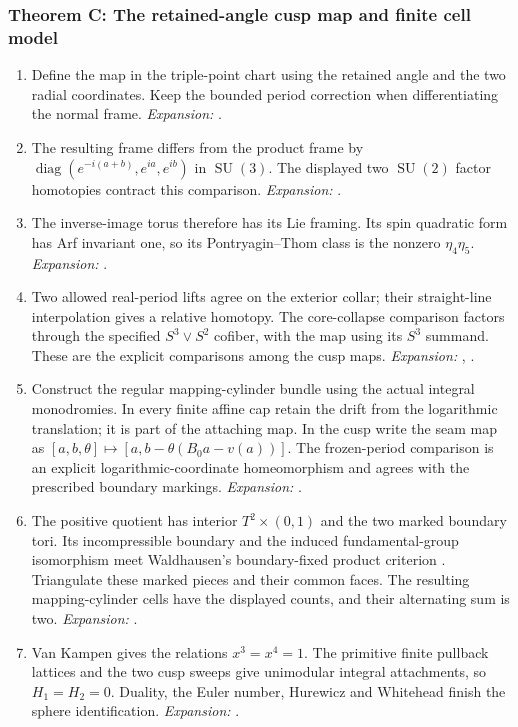 \hypertarget{outline-III-C}{}
\subsubsection*{Theorem C: The retained-angle cusp map and finite cell model}
\begin{enumerate}[label=\arabic*.,leftmargin=*]
\item\hypertarget{step-III-C-1}{} Define the map in the triple-point chart using the retained
angle and the two radial coordinates.  Keep the bounded period
correction when differentiating the normal frame.
\textit{Expansion:} .
\item\hypertarget{step-III-C-2}{} The resulting frame differs from the product frame by
$\operatorname{diag}(e^{-i(a+b)},e^{ia},e^{ib})$ in
$\operatorname{SU}(3)$.  The displayed two $\operatorname{SU}(2)$
factor homotopies contract this comparison.
\textit{Expansion:} .
\item\hypertarget{step-III-C-3}{} The inverse-image torus therefore has its Lie framing.  Its
spin quadratic form has Arf invariant one, so its Pontryagin--Thom
class is the nonzero $\eta_4\eta_5$.
\textit{Expansion:} .
\item\hypertarget{step-III-C-4}{} Two allowed real-period lifts agree on the exterior collar;
their straight-line interpolation gives a relative homotopy.
The core-collapse comparison factors through the specified
$S^3\vee S^2$ cofiber, with the map using its $S^3$ summand.
These are the explicit comparisons among the cusp maps.
\textit{Expansion:} , .
\item\hypertarget{step-III-C-5}{} Construct the regular mapping-cylinder bundle using the actual
integral monodromies.  In every finite affine cap retain the drift
from the logarithmic translation; it is part of the attaching map. In the cusp write the seam map as
$[a,b,\theta]\mapsto[a,b-\theta(B_0a-v(a))]$.
The frozen-period comparison is an explicit logarithmic-coordinate
homeomorphism and agrees with the prescribed boundary markings.
\textit{Expansion:} .
\item\hypertarget{step-III-C-6}{} The positive quotient has interior $T^2\times(0,1)$ and the
two marked boundary tori.  Its incompressible boundary and the
induced fundamental-group isomorphism meet Waldhausen's
boundary-fixed product criterion
\cite[Theorem~6.1, p.~77]{mapsWaldhausen68}. Triangulate these marked pieces and their common faces.  The
resulting mapping-cylinder cells have the displayed counts, and
their alternating sum is two.
\textit{Expansion:} .
\item\hypertarget{step-III-C-7}{} Van Kampen gives the relations $x^3=x^4=1$.  The primitive
finite pullback lattices and the two cusp sweeps give unimodular
integral attachments, so $H_1=H_2=0$.  Duality, the Euler number,
Hurewicz and Whitehead finish the sphere identification.
\textit{Expansion:} .
\end{enumerate}

